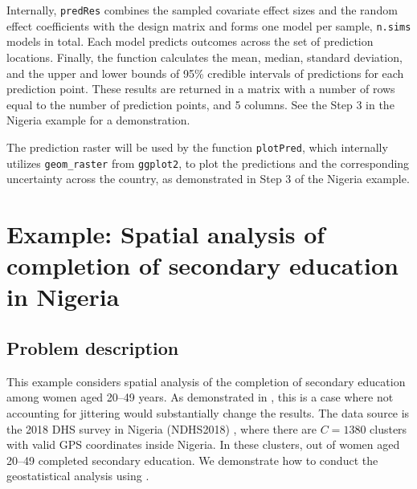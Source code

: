 Internally, \texttt{predRes} combines the sampled covariate effect sizes and the random effect coefficients with the design matrix and forms one model per sample, \texttt{n.sims}
models in total. Each model predicts outcomes across the set of prediction locations. Finally, the function calculates the mean, median, standard deviation, and the upper and lower bounds of 95\% credible intervals of predictions for each prediction point. These results are returned in a matrix with a number of rows equal to the number of prediction points, and 5 columns. See the Step 3 in the Nigeria example for a demonstration.

The prediction raster will be used by the function \texttt{plotPred}, which internally utilizes \texttt{geom\_raster} from \texttt{ggplot2}, to plot the predictions and the corresponding uncertainty across the country, as demonstrated in Step 3 of the Nigeria example. 


\section{Example: Spatial analysis of completion of secondary education in Nigeria\label{sec:example}}

\subsection{Problem description}
This example considers spatial analysis of the completion of secondary education among women aged 20--49 years. As demonstrated in \citet{altay2022covariates}, this is a case where not accounting for jittering would substantially change the results. The data source is the 2018 DHS survey in Nigeria (NDHS2018) \citep{NDHS2018}, where there are $C = 1380$ clusters with valid GPS coordinates inside Nigeria. In these clusters,  out of  women aged 20--49 completed secondary education. We demonstrate how to conduct the geostatistical analysis using .

